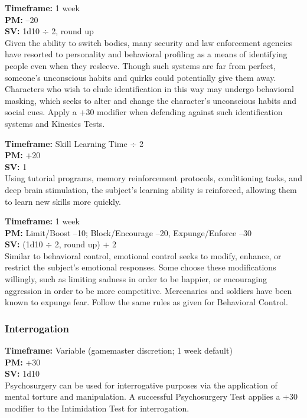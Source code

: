  \textbf{Timeframe:} 1 week \\ \textbf{PM:} –20 \\ \textbf{SV:} 1d10 $\div$ 2, round up \\ Given the ability to switch bodies, many security and law enforcement agencies have resorted to personality and behavioral profiling as a means of identifying people even when they resleeve. Though such systems are far from perfect, someone’s unconscious habits and quirks could potentially give them away. Characters who wish to elude identification in this way may undergo behavioral masking, which seeks to alter and change the character’s unconscious habits and social cues. Apply a +30 modifier when defending against such identification systems and Kinesics Tests. 

 \textbf{Timeframe:} Skill Learning Time $\div$ 2 \\ \textbf{PM:} +20 \\ \textbf{SV:} 1 \\ Using tutorial programs, memory reinforcement protocols, conditioning tasks, and deep brain stimulation, the subject’s learning ability is reinforced, allowing them to learn new skills more quickly. 

 \textbf{Timeframe:} 1 week \\ \textbf{PM:} Limit/Boost –10; Block/Encourage –20, Expunge/Enforce –30 \\ \textbf{SV:} (1d10 $\div$ 2, round up) + 2 \\ Similar to behavioral control, emotional control seeks to modify, enhance, or restrict the subject’s emotional responses. Some choose these modifications willingly, such as limiting sadness in order to be happier, or encouraging aggression in order to be more competitive. Mercenaries and soldiers have been known to expunge fear. Follow the same rules as given for Behavioral Control. 



\subsubsection{Interrogation} \textbf{Timeframe:} Variable (gamemaster discretion; 1 week default) \\ \textbf{PM:} +30 \\ \textbf{SV:} 1d10 \\ Psychosurgery can be used for interrogative purposes via the application of mental torture and manipulation. A successful Psychosurgery Test applies a +30 modifier to the Intimidation Test for interrogation. 

